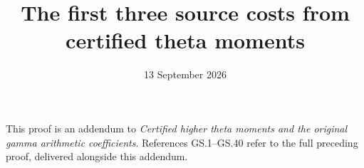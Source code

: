 \documentclass[11pt]{article}
\title{The first three source costs from certified theta moments}
\author{}
\date{13 September 2026}
\begin{document}
\maketitle
This proof is an addendum to \emph{Certified higher theta moments and
the original gamma arithmetic coefficients}. References GS.1--GS.40
refer to the full preceding proof, delivered alongside this addendum.

\end{document}
